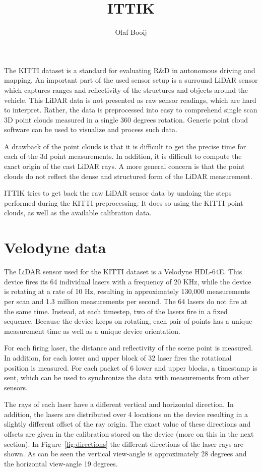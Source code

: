 \documentclass[english]{article}
\begin{document}
\title{ITTIK}
\author{Olaf Booij}

\maketitle

The KITTI dataset is a standard for evaluating R\&D in autonomous
driving and mapping. An important part of the used sensor setup is a
surround LiDAR sensor which captures ranges and reflectivity of the
structures and objects around the vehicle.
This LiDAR data is not presented as raw sensor readings, which are hard
to interpret. Rather, the data is preprocessed into easy to comprehend
single scan 3D point clouds measured in a single 360 degrees rotation.
Generic point cloud software can be used to visualize and process such
data.

A drawback of the point clouds is that it is difficult to get the
precise time for each of the 3d point measurements. In addition, it is
difficult to compute the exact origin of the cast LiDAR rays. A more
general concern is that the point clouds do not reflect the dense and
structured form of the LiDAR measurement.

ITTIK tries to get back the raw LiDAR sensor data by undoing the steps
performed during the KITTI preprocessing. It does so using the KITTI
point clouds, as well as the available calibration data.

\section{Velodyne data}
The LiDAR sensor used for the KITTI dataset is a Velodyne HDL-64E. This
device fires its 64 individual lasers with a frequency of 20 KHz, while
the device is rotating at a rate of 10 Hz, resulting in approximately
130,000 measurements per scan and 1.3 million measurements per
second. The 64 lasers do not fire at the same time. Instead, at each
timestep, two of the lasers fire in a fixed sequence. Because the device
keeps on rotating, each pair of points has a unique measurement time as
well as a unique device orientation.

For each firing laser, the distance and reflectivity of the scene point
is measured. In addition, for each lower and upper block of 32 laser
fires the rotational position is measured. For each packet of 6 lower
and upper blocks, a timestamp is sent, which can be used to
synchronize the data with measurements from other sensors.

The rays of each laser have a different vertical and horizontal
direction. In addition, the lasers are distributed over 4 locations on
the device resulting in a slightly different offset of the ray origin.
The exact value of these directions and offsets are given in the
calibration stored on the device (more on this in the next section).
In Figure~\ref{fig:directions} the different directions of the laser
rays are shown. As can be seen the vertical view-angle is approximately
28 degrees and the horizontal view-angle 19 degrees.
\end{document}
